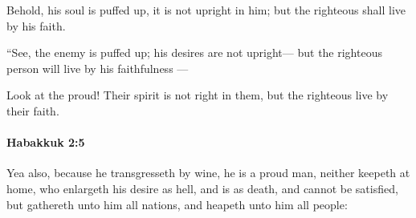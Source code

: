 			\begin{versebox}
					\item[BHS] 
					\item[LXX] 
					\item[ASV] Behold, his soul is puffed up, it is not upright in him; but the righteous shall live by his faith.
					\item[NIV] “See, the enemy is puffed up; his desires are not upright— but the righteous person will live by his faithfulness —
					\item[NRSV] Look at the proud! Their spirit is not right in them, but the righteous live by their faith.
			\end{versebox}

		\paragraph{Habakkuk 2:5} %
			\label{HABAKKUK-2-5}

			Yea also, because he transgresseth by wine, he is a proud man, neither keepeth at home, who enlargeth his desire as hell, and is as death, and cannot be satisfied, but gathereth unto him all nations, and heapeth unto him all people:

